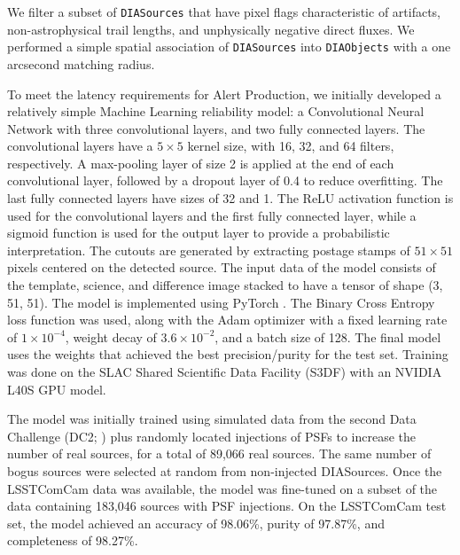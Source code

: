 We filter a subset of \texttt{DIASources} that have pixel flags characteristic of artifacts, non-astrophysical trail lengths, and unphysically negative direct fluxes.
We performed a simple spatial association of \texttt{DIASources} into \texttt{DIAObjects} with a one arcsecond matching radius.

To meet the latency requirements for \gls{Alert Production}, we initially developed a relatively simple Machine Learning reliability model: a Convolutional Neural Network with three convolutional layers, and two fully connected layers.
The convolutional layers have a $5\times5$ kernel size, with 16, 32, and 64 filters, respectively.
A max-pooling layer of size 2 is applied at the end of each convolutional layer, followed by a dropout layer of 0.4 to reduce overfitting.
The last fully connected layers have sizes of 32 and 1.
The ReLU activation function is used for the convolutional layers and the first fully connected layer, while a sigmoid function is used for the output layer to provide a probabilistic interpretation.
The cutouts are generated by extracting postage stamps of $51\times51$ pixels centered on the detected source.
The input data of the model consists of the template, science, and difference image stacked to have a tensor of \gls{shape} (3, 51, 51).
The model is implemented using PyTorch \citep{10.1145/3620665.3640366}.
The Binary Cross Entropy loss function was used, along with the Adam optimizer with a fixed learning rate of $1\times10^{-4}$, weight decay of $3.6\times10^{-2}$, and a batch size of 128.
The final model uses the weights that achieved the best precision/purity for the test set.
Training was done on the SLAC Shared Scientific Data Facility (\gls{S3DF}) with an NVIDIA L40S GPU model.

The model was initially trained using simulated data from the second Data Challenge (DC2; \citep{2021ApJS..253...31L}) plus randomly located injections of PSFs to increase the number of real sources, for a total of 89,066 real sources.
The same number of bogus sources were selected at random from non-injected DIASources.
Once the  \gls{LSSTComCam} data was available, the model was fine-tuned on a subset of the data containing 183,046 sources with PSF injections.
On the \gls{LSSTComCam} test set, the model achieved an accuracy of 98.06\%, purity of 97.87\%, and completeness of 98.27\%.

